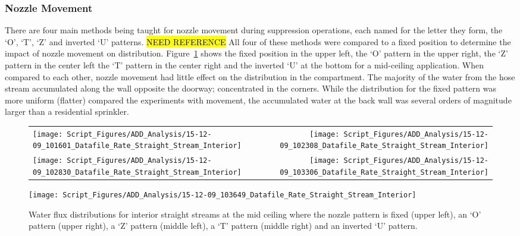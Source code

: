 \documentclass[12pt,oneside]{book}
\begin{document}
\subsubsection{Nozzle Movement}
There are four main methods being taught for nozzle movement during suppression operations, each named for the letter they form, the `O', `T', `Z' and inverted `U' patterns. \hl{NEED REFERENCE} All four of these methods were compared to a fixed position to determine the impact of nozzle movement on distribution. Figure~\ref{fig:Nozzle Movements Example, First Floor Interior} shows the fixed position in the upper left, the `O' pattern in the upper right, the `Z' pattern in the center left the `T' pattern in the center right and the inverted `U' at the bottom for a mid-ceiling application. When compared to each other, nozzle movement had little effect on the distribution in the compartment. The majority of the water from the hose stream accumulated along the wall opposite the doorway; concentrated in the corners. While the distribution for the fixed pattern was more uniform (flatter) compared the experiments with movement, the accumulated water at the back wall was several orders of magnitude larger than a residential sprinkler. 

\begin{figure}[ht]
\begin{tabular*}{\textwidth}{lr}
\texttt{[image: Script\_Figures/ADD\_Analysis/15-12-09\_101601\_Datafile\_Rate\_Straight\_Stream\_Interior]} &
\texttt{[image: Script\_Figures/ADD\_Analysis/15-12-09\_102308\_Datafile\_Rate\_Straight\_Stream\_Interior]} \\
\texttt{[image: Script\_Figures/ADD\_Analysis/15-12-09\_102830\_Datafile\_Rate\_Straight\_Stream\_Interior]} &
\texttt{[image: Script\_Figures/ADD\_Analysis/15-12-09\_103306\_Datafile\_Rate\_Straight\_Stream\_Interior]} \\
\end{tabular*}
\centering
\texttt{[image: Script\_Figures/ADD\_Analysis/15-12-09\_103649\_Datafile\_Rate\_Straight\_Stream\_Interior]}
\caption[Straight Stream Varied Nozzle Movements, First Floor Interior]{Water flux distributions for interior straight streams at the mid ceiling where the nozzle pattern is fixed (upper left), an `O' pattern (upper right), a `Z' pattern (middle left), a `T' pattern (middle right) and an inverted `U' pattern. }
\label{fig:Nozzle Movements Example, First Floor Interior}
\end{figure}

\clearpage
\end{document}
